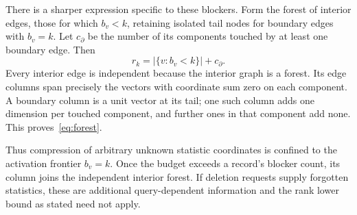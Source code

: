 \documentclass[11pt,a4paper]{article}
\theoremstyle{definition}\newtheorem{definition}[theorem]{Definition}
\begin{document}
There is a sharper expression specific to these blockers. Form the forest of interior edges, those for which $b_v<k$, retaining isolated tail nodes for boundary edges with $b_v=k$. Let $c_{\partial}$ be the number of its components touched by at least one boundary edge. Then
\begin{equation}\label{eq:forest}
 r_k=|\{v:b_v<k\}|+c_{\partial}.
\end{equation}
Every interior edge is independent because the interior graph is a forest. Its edge columns span precisely the vectors with coordinate sum zero on each component. A boundary column is a unit vector at its tail; one such column adds one dimension per touched component, and further ones in that component add none. This proves~\eqref{eq:forest}.

Thus compression of arbitrary unknown statistic coordinates is confined to the activation frontier $b_v=k$. Once the budget exceeds a record's blocker count, its column joins the independent interior forest. If deletion requests supply forgotten statistics, these are additional query-dependent information and the rank lower bound as stated need not apply.
\end{document}
